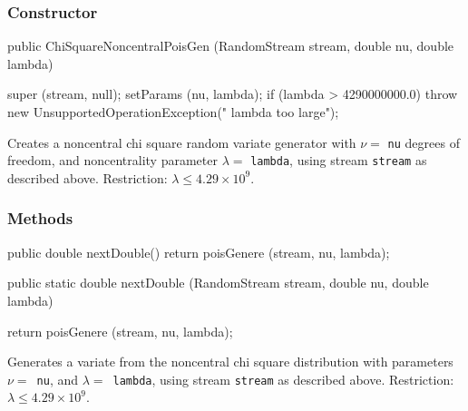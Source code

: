 \subsubsection* {Constructor}

\begin{code}

   public ChiSquareNoncentralPoisGen (RandomStream stream,
                                      double nu, double lambda) \begin{hide} {
      super (stream, null);
      setParams (nu, lambda);
      if (lambda > 4290000000.0)
         throw new UnsupportedOperationException("   lambda too large");
   }\end{hide}
\end{code}
\begin{tabb} Creates a noncentral chi square random variate generator
with $\nu = $ \texttt{nu} degrees of freedom, and noncentrality parameter
$\lambda = $ \texttt{lambda}, using stream \texttt{stream} as described above.
Restriction:  $\lambda \le 4.29\times 10^9$.
\end{tabb}


\subsubsection* {Methods}
\begin{code}\begin{hide}

   public double nextDouble() {
      return poisGenere (stream, nu, lambda);
   }\end{hide}

   public static double nextDouble (RandomStream stream,
                                    double nu, double lambda) \begin{hide} {
      return poisGenere (stream, nu, lambda);
   }\end{hide}
\end{code}
\begin{tabb}  Generates a variate from the noncentral chi square
   distribution with
   parameters $\nu = $~\texttt{nu}, and $\lambda = $~\texttt{lambda}, using
   stream \texttt{stream} as described above.
   Restriction:  $\lambda \le 4.29\times 10^9$.
\end{tabb}
\begin{code}\begin{hide}

//>>>>>>>>>>>>>>>>>>>>  P R I V A T E S    M E T H O D S   <<<<<<<<<<<<<<<<<<<<

   private static double poisGenere (RandomStream s, double nu, double lambda) {
      int j = PoissonTIACGen.nextInt (s, 0.5*lambda);
      return GammaAcceptanceRejectionGen.nextDouble (s, 0.5*nu + j, 0.5);
   }

}\end{hide}
\end{code}
